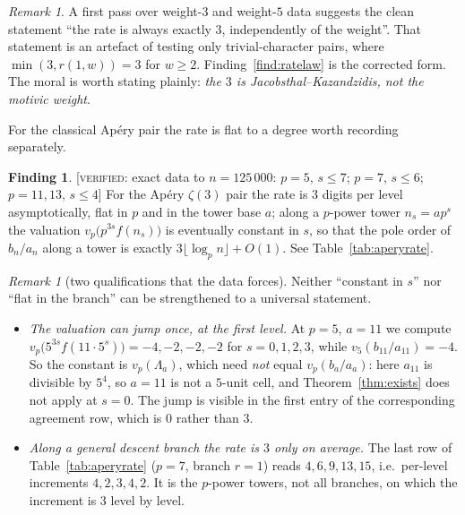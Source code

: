 \documentclass[11pt,reqno]{article}
\newcommand{\vp}{v_p}
\newcommand{\floor}[1]{\lfloor #1 \rfloor}
\newcommand{\VER}[1]{{\normalfont\textsc{[verified:} #1\textsc{]}}}
\theoremstyle{plain}
\theoremstyle{definition}
\newtheorem{finding}[theorem]{Finding}
\theoremstyle{remark}
\newtheorem{remark}[theorem]{Remark}
\numberwithin{equation}{section}
\begin{document}
\begin{remark}\label{rem:not-weight}
A first pass over weight-$3$ and weight-$5$ data suggests the clean statement
``the rate is always exactly $3$, independently of the weight''.  That statement
is an artefact of testing only trivial-character pairs, where
$\min(3,r(1,w))=3$ for $w\ge2$.  Finding~\ref{find:ratelaw} is the corrected
form.  The moral is worth stating plainly: \emph{the $3$ is
Jacobsthal--Kazandzidis, not the motivic weight}.
\end{remark}

For the classical Ap\'ery pair the rate is flat to a degree worth recording
separately.

\begin{finding}\label{find:aperyrate}
\VER{exact data to $n=125\,000$: $p=5$, $s\le7$; $p=7$, $s\le6$; $p=11,13$,
$s\le4$} For the Ap\'ery $\zeta(3)$ pair the rate is $3$ digits per
level asymptotically, flat in $p$ and in the tower base $a$; along a $p$-power tower
$n_s=ap^s$ the valuation $\vp\bigl(p^{3s}f(n_s)\bigr)$ is eventually constant in $s$, so that
the pole order of $b_n/a_n$ along a tower is exactly $3\floor{\log_pn}+O(1)$.  See
Table~\ref{tab:aperyrate}.
\end{finding}

\begin{remark}[two qualifications that the data forces]\label{rem:notflat}
Neither ``constant in $s$'' nor ``flat in the branch'' can be strengthened to a universal
statement.
\begin{itemize}[leftmargin=1.4em]
\item \emph{The valuation can jump once, at the first level.}  At $p=5$, $a=11$ we compute
  $\vp\bigl(5^{3s}f(11\cdot5^s)\bigr)=-4,-2,-2,-2$ for $s=0,1,2,3$, while
  $v_5(b_{11}/a_{11})=-4$.  So the constant is $\vp(\Lambda_a)$, which need \emph{not} equal
  $\vp(b_a/a_a)$: here $a_{11}$ is divisible by $5^4$, so $a=11$ is not a $5$-unit cell, and
  Theorem~\ref{thm:exists} does not apply at $s=0$.  The jump is visible in the first entry of
  the corresponding agreement row, which is $0$ rather than $3$.
\item \emph{Along a general descent branch the rate is $3$ only on average.}  The last row of
  Table~\ref{tab:aperyrate} ($p=7$, branch $r=1$) reads $4,6,9,13,15$, i.e.\ per-level
  increments $4,2,3,4,2$.  It is the $p$-power towers, not all branches, on which the increment
  is $3$ level by level.
\end{itemize}
\end{remark}
\end{document}
